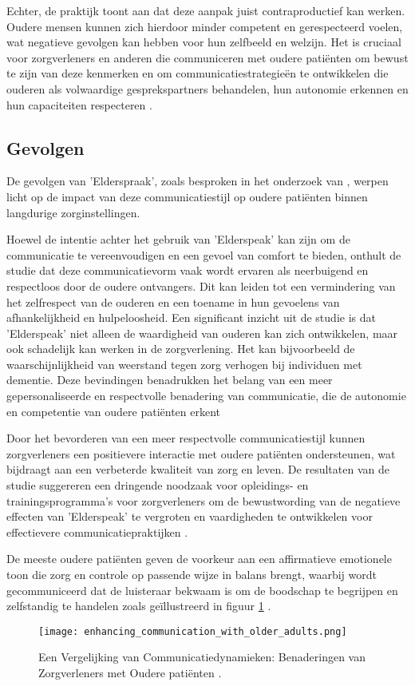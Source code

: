 Echter, de praktijk toont aan dat deze aanpak juist contraproductief kan werken. Oudere mensen kunnen zich hierdoor minder competent en gerespecteerd voelen, wat negatieve gevolgen kan hebben voor hun zelfbeeld en welzijn. Het is cruciaal voor zorgverleners en anderen die communiceren met oudere patiënten om bewust te zijn van deze kenmerken en om communicatiestrategieën te ontwikkelen die ouderen als volwaardige gesprekspartners behandelen, hun autonomie erkennen en hun capaciteiten respecteren \autocite{williams2005enhancing}.

\subsection{Gevolgen}
De gevolgen van 'Elderspraak', zoals besproken in het onderzoek van \textcite{grimme2015understanding}, werpen licht op de impact van deze communicatiestijl op oudere patiënten binnen langdurige zorginstellingen.


Hoewel de intentie achter het gebruik van 'Elderspeak' kan zijn om de communicatie te vereenvoudigen en een gevoel van comfort te bieden, onthult de studie dat deze communicatievorm vaak wordt ervaren als neerbuigend en respectloos door de oudere ontvangers. Dit kan leiden tot een vermindering van het zelfrespect van de ouderen en een toename in hun gevoelens van afhankelijkheid en hulpeloosheid. Een significant inzicht uit de studie is dat 'Elderspeak' niet alleen de waardigheid van ouderen kan zich ontwikkelen, maar ook schadelijk kan werken in de zorgverlening. Het kan bijvoorbeeld de waarschijnlijkheid van weerstand tegen zorg verhogen bij individuen met dementie. Deze bevindingen benadrukken het belang van een meer gepersonaliseerde en respectvolle benadering van communicatie, die de autonomie en competentie van oudere patiënten erkent 

Door het bevorderen van een meer respectvolle communicatiestijl kunnen zorgverleners een positievere interactie met oudere patiënten ondersteunen, wat bijdraagt aan een verbeterde kwaliteit van zorg en leven. De resultaten van de studie suggereren een dringende noodzaak voor opleidings- en trainingsprogramma's voor zorgverleners om de bewustwording van de negatieve effecten van 'Elderspeak' te vergroten en vaardigheden te ontwikkelen voor effectievere communicatiepraktijken \autocite{grimme2015understanding}.

 De meeste oudere patiënten geven de voorkeur aan een affirmatieve emotionele toon die zorg en controle op passende wijze in balans brengt, waarbij wordt gecommuniceerd dat de luisteraar bekwaam is om de boodschap te begrijpen en zelfstandig te handelen zoals geïllustreerd in figuur  \ref{fig:voorbeeld_affirmative_toon} \autocite{williams2005enhancing}.
\begin{figure}[h]
    \centering
    \texttt{[image: enhancing\_communication\_with\_older\_adults.png]}
    \captionsetup{justification=centering}
    \caption{Een Vergelijking van Communicatiedynamieken: Benaderingen van Zorgverleners met Oudere patiënten \autocite{williams2005enhancing}.}
    \label{fig:voorbeeld_affirmative_toon}
\end{figure}


